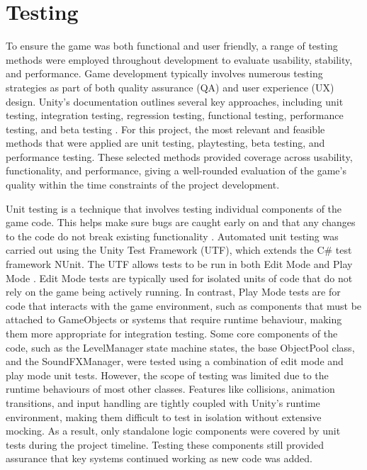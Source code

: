 \documentclass[10pt]{final_report}
\begin{document}
\section{Testing}\label{testing}

To ensure the game was both functional and user friendly, a range of testing methods were employed throughout development to evaluate usability, stability, and performance. Game development typically involves numerous testing strategies as part of both quality assurance (QA) and user experience (UX) design. Unity’s documentation outlines several key approaches, including unit testing, integration testing, regression testing, functional testing, performance testing, and beta testing \cite{UnityTesting}. For this project, the most relevant and feasible methods that were applied are unit testing, playtesting, beta testing, and performance testing. 
These selected methods provided coverage across usability, functionality, and performance, giving a well-rounded evaluation of the game's quality within the time constraints of the project development.\newline

Unit testing is a technique that involves testing individual components of the game code. This helps make sure bugs are caught early on and that any changes to the code do not break existing functionality \cite{UnityTesting}. Automated unit testing was carried out using the Unity Test Framework (UTF), which extends the C\# test framework NUnit. The UTF allows tests to be run in both Edit Mode and Play Mode \cite{UnityUTF}. Edit Mode tests are typically used for isolated units of code that do not rely on the game being actively running. In contrast, Play Mode tests are for code that interacts with the game environment, such as components that must be attached to GameObjects or systems that require runtime behaviour, making them more appropriate for integration testing. Some core components of the code, such as the LevelManager state machine states, the base ObjectPool class, and the SoundFXManager, were tested using a combination of edit mode and play mode unit tests. However, the scope of testing was limited due to the runtime behaviours of most other classes. Features like collisions, animation transitions, and input handling are tightly coupled with Unity’s runtime environment, making them difficult to test in isolation without extensive mocking. As a result, only standalone logic components were covered by unit tests during the project timeline. Testing these components still provided assurance that key systems continued working as new code was added.\newline
\end{document}
